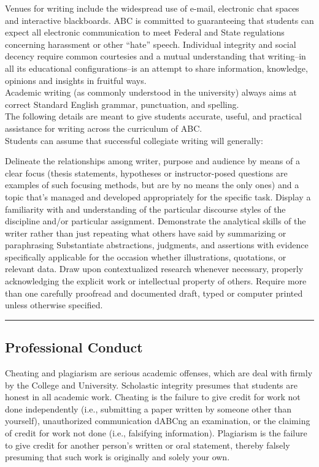 Venues for writing include the widespread use of e-mail, electronic chat spaces and interactive blackboards.  ABC is committed to guaranteeing that students can expect all electronic communication to meet Federal and State regulations concerning harassment or other ``hate'' speech. Individual integrity and social decency require common courtesies and a mutual understanding that writing--in all its educational configurations--is an attempt to share information, knowledge, opinions and insights in fruitful ways. \\

Academic writing (as commonly understood in the university) always aims at correct Standard English grammar, punctuation, and spelling.\\

The following details are meant to give students accurate, useful, and practical assistance for writing across the curriculum of ABC.  \\

Students can assume that successful collegiate writing will generally:  
\begin{outline}
	\1	Delineate the relationships among writer, purpose and audience by means of a clear focus (thesis statements, hypotheses or instructor-posed questions are examples of such focusing methods, but are by no means the only ones) and a topic that’s managed and developed appropriately for the specific task. 
	\1	Display a familiarity with and understanding of the particular discourse styles of the discipline and/or particular assignment.
	\1	Demonstrate the analytical skills of the writer rather than just repeating what others have said by summarizing or paraphrasing
	\1	Substantiate abstractions, judgments, and assertions with evidence specifically applicable for the occasion whether illustrations, quotations, or relevant data.
	\1	Draw upon contextualized research whenever necessary, properly acknowledging the explicit work or intellectual property of others.
	\1	Require more than one carefully proofread and documented draft, typed or computer printed unless otherwise specified.
\end{outline}

\vspace{2ex}\hrule\vspace{2ex}



\subsection*{Professional Conduct}
Cheating and plagiarism are serious academic offenses, which are deal with firmly by the College and University. Scholastic integrity presumes that students are honest in all academic work. Cheating is the failure to give credit for work not done independently (i.e., submitting a paper written by someone other than yourself), unauthorized communication dABCng an examination, or the claiming of credit for work not done (i.e., falsifying information). Plagiarism is the failure to give credit for another person’s written or oral statement, thereby falsely presuming that such work is originally and solely your own. \\ 

